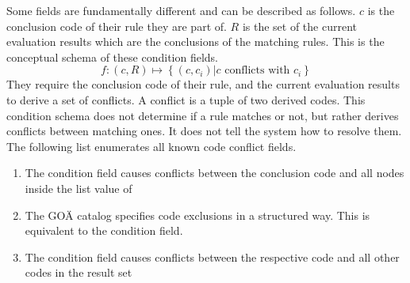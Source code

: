 Some fields are fundamentally different and can be described as follows.
$c$ is the conclusion code of their rule they are part of.
$R$ is the set of the current evaluation results which are the conclusions of the matching rules.
This is the conceptual schema of these condition fields.
\[
    f: \left( c, R \right) \mapsto \left\{ \left( c, c_i \right) \lvert c \text{ conflicts with } c_i \right\}
\]
They require the conclusion code of their rule, and the current evaluation results to derive a set of conflicts.
A conflict is a tuple of two derived codes.
This condition schema does not determine if a rule matches or not, but rather derives conflicts between matching ones.
It does not tell the system how to resolve them.
The following list enumerates all known code conflict fields.
\begin{enumerate}
    \item The condition field  causes conflicts between the conclusion code and all nodes inside the list value of 
    \item The GOÄ catalog specifies code exclusions in a structured way.
    This is equivalent to the  condition field.
    \item The condition field  causes conflicts between the respective code and all other codes in the result set
\end{enumerate}

